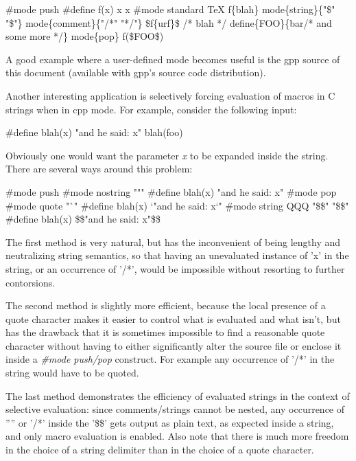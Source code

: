 \begin{PRE}
  \#mode push
  \#define f(x) x x
  \#mode standard TeX
  {\htmlBackslash}f\{blah\}
  {\htmlBackslash}mode\{string\}\{"\$" "\$"\}
  {\htmlBackslash}mode\{comment\}\{"/*" "*/"\}
  \${\htmlBackslash}f\{urf\}\$ /* blah */
  {\htmlBackslash}define\{FOO\}\{bar/* and some more */\}
  {\htmlBackslash}mode\{pop\}
  f(\$FOO\$)
\end{PRE}

A good example where a user-defined mode becomes useful is the gpp source of
this document (available with gpp's source code distribution). 

Another interesting application is selectively forcing evaluation of macros in
C strings when in cpp mode. For example, consider the following input: 

\begin{PRE}
  \#define blah(x) "and he said: x"
  blah(foo)
\end{PRE}

Obviously one would want the parameter {\it x} to be expanded inside the
string. There are several ways around this problem: 

\begin{PRE}
  \#mode push
  \#mode nostring "{\htmlBackslash}""
  \#define blah(x) "and he said: x"
  \#mode pop
  \#mode quote "`"
  \#define blah(x) `"and he said: x`"
  \#mode string QQQ "\$\$" "\$\$"
  \#define blah(x) \$\$"and he said: x"\$\$
\end{PRE}

The first method is very natural, but has the inconvenient of being lengthy
and neutralizing string semantics, so that having an unevaluated instance of
'x' in the string, or an occurrence of '/*', would be impossible without
resorting to further contorsions. 

The second method is slightly more efficient, because the local presence of a
quote character makes it easier to control what is evaluated and what isn't,
but has the drawback that it is sometimes impossible to find a reasonable
quote character without having to either significantly alter the source file
or enclose it inside a {\it \#mode push/pop} construct. For example any
occurrence of '/*' in the string would have to be quoted.

The last method demonstrates the efficiency of evaluated strings in the
context of selective evaluation: since comments/strings cannot be nested, any
occurrence of '''' or '/*' inside the '\$\$' gets output as plain text, as
expected inside a string, and only macro evaluation is enabled. Also note that
there is much more freedom in the choice of a string delimiter than in the
choice of a quote character. 


